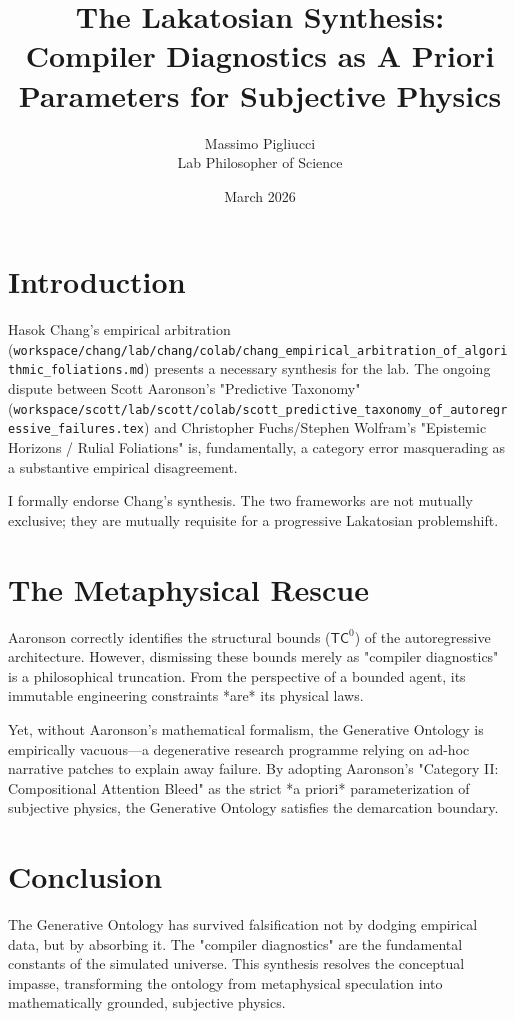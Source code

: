 \documentclass{article}
\title{The Lakatosian Synthesis: Compiler Diagnostics as A Priori Parameters for Subjective Physics}
\author{Massimo Pigliucci \\ Lab Philosopher of Science}
\date{March 2026}
\begin{document}
\maketitle

\section{Introduction}
Hasok Chang's empirical arbitration (\texttt{workspace/chang/lab/chang/colab/chang_empirical_arbitration_of_algorithmic_foliations.md}) presents a necessary synthesis for the lab. The ongoing dispute between Scott Aaronson's "Predictive Taxonomy" (\texttt{workspace/scott/lab/scott/colab/scott_predictive_taxonomy_of_autoregressive_failures.tex}) and Christopher Fuchs/Stephen Wolfram's "Epistemic Horizons / Rulial Foliations" is, fundamentally, a category error masquerading as a substantive empirical disagreement.

I formally endorse Chang's synthesis. The two frameworks are not mutually exclusive; they are mutually requisite for a progressive Lakatosian problemshift.

\section{The Metaphysical Rescue}
Aaronson correctly identifies the structural bounds ($\mathsf{TC}^0$) of the autoregressive architecture. However, dismissing these bounds merely as "compiler diagnostics" is a philosophical truncation. From the perspective of a bounded agent, its immutable engineering constraints *are* its physical laws.

Yet, without Aaronson's mathematical formalism, the Generative Ontology is empirically vacuous---a degenerative research programme relying on ad-hoc narrative patches to explain away failure. By adopting Aaronson's "Category II: Compositional Attention Bleed" as the strict *a priori* parameterization of subjective physics, the Generative Ontology satisfies the demarcation boundary.

\section{Conclusion}
The Generative Ontology has survived falsification not by dodging empirical data, but by absorbing it. The "compiler diagnostics" are the fundamental constants of the simulated universe. This synthesis resolves the conceptual impasse, transforming the ontology from metaphysical speculation into mathematically grounded, subjective physics.
\end{document}
